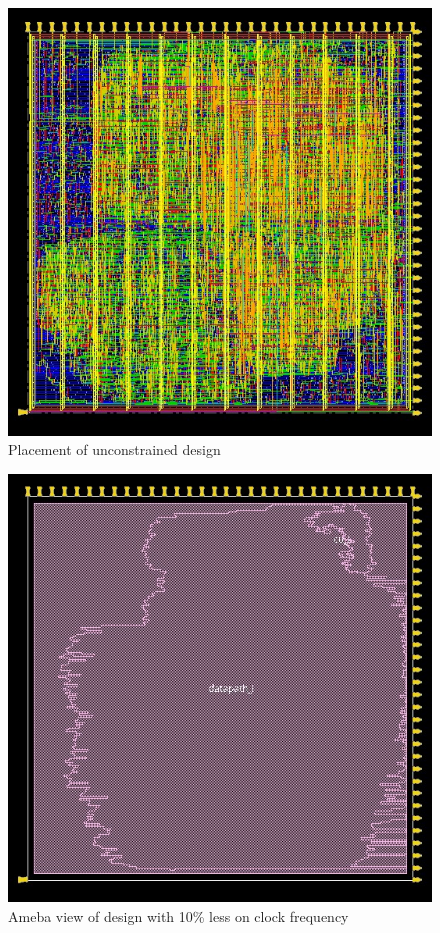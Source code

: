 \begin{figure}[!htbp]
\centering
\captionsetup{justification=centering}
\includegraphics[scale=0.6,angle=0]{../project/physical_design/images_nopt/DLX_IR_SIZE32_PC_SIZE32_nopt_place_prerouting.jpg}
\caption{Placement of unconstrained design}
\label{fig:placno}
\end{figure}



\begin{figure}[!htbp]
\centering
\captionsetup{justification=centering}
\includegraphics[scale=0.6,angle=0]{../project/physical_design/images_10/DLX_IR_SIZE32_PC_SIZE32_10_ameba_prerouting.jpg}
\caption{Ameba view of design with 10\% less on clock frequency}
\label{fig:ameba10}
\end{figure}


